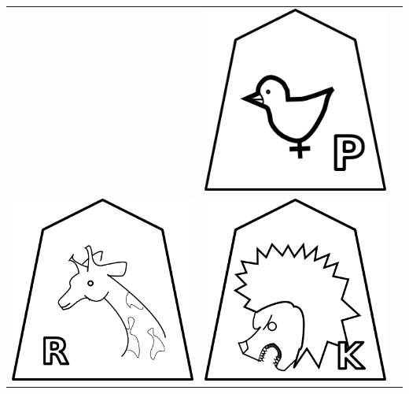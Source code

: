 \documentclass{beamer}
\begin{document}
\begin{frame}
\begin{center}
\begin{tabular}{ccc}
& \includegraphics[scale = 0.2]{../../graphics/Pawn.png} & \\
\includegraphics[scale = 0.2]{../../graphics/Rook.png}&
\includegraphics[scale = 0.2]{../../graphics/King.png}&

\end{tabular}
\end{center}
\end{frame}
\end{document}
